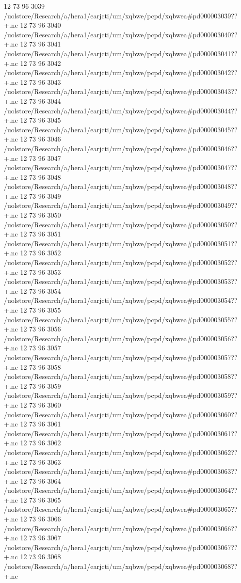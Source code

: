 12 73 96
3039
/uolstore/Research/a/hera1/earjcti/um/xqbwe/pcpd/xqbwea#pd000003039??+.nc
12 73 96
3040
/uolstore/Research/a/hera1/earjcti/um/xqbwe/pcpd/xqbwea#pd000003040??+.nc
12 73 96
3041
/uolstore/Research/a/hera1/earjcti/um/xqbwe/pcpd/xqbwea#pd000003041??+.nc
12 73 96
3042
/uolstore/Research/a/hera1/earjcti/um/xqbwe/pcpd/xqbwea#pd000003042??+.nc
12 73 96
3043
/uolstore/Research/a/hera1/earjcti/um/xqbwe/pcpd/xqbwea#pd000003043??+.nc
12 73 96
3044
/uolstore/Research/a/hera1/earjcti/um/xqbwe/pcpd/xqbwea#pd000003044??+.nc
12 73 96
3045
/uolstore/Research/a/hera1/earjcti/um/xqbwe/pcpd/xqbwea#pd000003045??+.nc
12 73 96
3046
/uolstore/Research/a/hera1/earjcti/um/xqbwe/pcpd/xqbwea#pd000003046??+.nc
12 73 96
3047
/uolstore/Research/a/hera1/earjcti/um/xqbwe/pcpd/xqbwea#pd000003047??+.nc
12 73 96
3048
/uolstore/Research/a/hera1/earjcti/um/xqbwe/pcpd/xqbwea#pd000003048??+.nc
12 73 96
3049
/uolstore/Research/a/hera1/earjcti/um/xqbwe/pcpd/xqbwea#pd000003049??+.nc
12 73 96
3050
/uolstore/Research/a/hera1/earjcti/um/xqbwe/pcpd/xqbwea#pd000003050??+.nc
12 73 96
3051
/uolstore/Research/a/hera1/earjcti/um/xqbwe/pcpd/xqbwea#pd000003051??+.nc
12 73 96
3052
/uolstore/Research/a/hera1/earjcti/um/xqbwe/pcpd/xqbwea#pd000003052??+.nc
12 73 96
3053
/uolstore/Research/a/hera1/earjcti/um/xqbwe/pcpd/xqbwea#pd000003053??+.nc
12 73 96
3054
/uolstore/Research/a/hera1/earjcti/um/xqbwe/pcpd/xqbwea#pd000003054??+.nc
12 73 96
3055
/uolstore/Research/a/hera1/earjcti/um/xqbwe/pcpd/xqbwea#pd000003055??+.nc
12 73 96
3056
/uolstore/Research/a/hera1/earjcti/um/xqbwe/pcpd/xqbwea#pd000003056??+.nc
12 73 96
3057
/uolstore/Research/a/hera1/earjcti/um/xqbwe/pcpd/xqbwea#pd000003057??+.nc
12 73 96
3058
/uolstore/Research/a/hera1/earjcti/um/xqbwe/pcpd/xqbwea#pd000003058??+.nc
12 73 96
3059
/uolstore/Research/a/hera1/earjcti/um/xqbwe/pcpd/xqbwea#pd000003059??+.nc
12 73 96
3060
/uolstore/Research/a/hera1/earjcti/um/xqbwe/pcpd/xqbwea#pd000003060??+.nc
12 73 96
3061
/uolstore/Research/a/hera1/earjcti/um/xqbwe/pcpd/xqbwea#pd000003061??+.nc
12 73 96
3062
/uolstore/Research/a/hera1/earjcti/um/xqbwe/pcpd/xqbwea#pd000003062??+.nc
12 73 96
3063
/uolstore/Research/a/hera1/earjcti/um/xqbwe/pcpd/xqbwea#pd000003063??+.nc
12 73 96
3064
/uolstore/Research/a/hera1/earjcti/um/xqbwe/pcpd/xqbwea#pd000003064??+.nc
12 73 96
3065
/uolstore/Research/a/hera1/earjcti/um/xqbwe/pcpd/xqbwea#pd000003065??+.nc
12 73 96
3066
/uolstore/Research/a/hera1/earjcti/um/xqbwe/pcpd/xqbwea#pd000003066??+.nc
12 73 96
3067
/uolstore/Research/a/hera1/earjcti/um/xqbwe/pcpd/xqbwea#pd000003067??+.nc
12 73 96
3068
/uolstore/Research/a/hera1/earjcti/um/xqbwe/pcpd/xqbwea#pd000003068??+.nc
